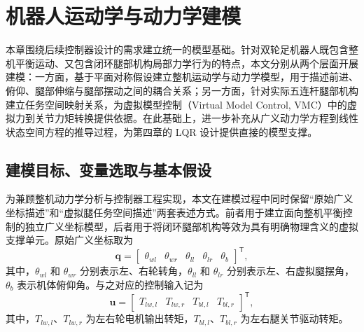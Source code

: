 \chapter{机器人运动学与动力学建模}\label{chap:model}

本章围绕后续控制器设计的需求建立统一的模型基础。针对双轮足机器人既包含整机平衡运动、又包含闭环腿部机构局部力学行为的特点，本文分别从两个层面开展建模：一方面，基于平面对称假设建立整机运动学与动力学模型，用于描述前进、俯仰、腿部伸缩与腿部摆动之间的耦合关系；另一方面，针对实际五连杆腿部机构建立任务空间映射关系，为虚拟模型控制（Virtual Model Control, VMC）中的虚拟力到关节力矩转换提供依据。在此基础上，进一步补充从广义动力学方程到线性状态空间方程的推导过程，为第四章的 LQR 设计提供直接的模型支撑。

\section{建模目标、变量选取与基本假设}

为兼顾整机动力学分析与控制器工程实现，本文在建模过程中同时保留“原始广义坐标描述”和“虚拟腿任务空间描述”两套表述方式。前者用于建立面向整机平衡控制的独立广义坐标模型，后者用于将闭环腿部机构等效为具有明确物理含义的虚拟支撑单元。原始广义坐标取为
\begin{equation}
  \boldsymbol{q} =
  \begin{bmatrix}
    \theta_{wl} & \theta_{wr} & \theta_{ll} & \theta_{lr} & \theta_b
  \end{bmatrix}^{\mathsf{T}},
  \label{eq:generalized-coordinate-origin}
\end{equation}
其中，$\theta_{wl}$ 和 $\theta_{wr}$ 分别表示左、右轮转角，$\theta_{ll}$ 和 $\theta_{lr}$ 分别表示左、右虚拟腿摆角，$\theta_b$ 表示机体俯仰角。与之对应的控制输入记为
\begin{equation}
  \boldsymbol{u} =
  \begin{bmatrix}
    T_{lw,l} & T_{lw,r} & T_{bl,l} & T_{bl,r}
  \end{bmatrix}^{\mathsf{T}},
  \label{eq:input-origin}
\end{equation}
其中，$T_{lw,l}$、$T_{lw,r}$ 为左右轮电机输出转矩，$T_{bl,l}$、$T_{bl,r}$ 为左右腿关节驱动转矩。

